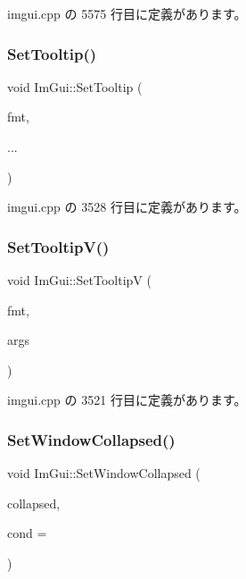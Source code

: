  imgui.\+cpp の 5575 行目に定義があります。

\mbox{\label{namespace_im_gui_a313073fa01b8a9791f241ef93091ce92}} 
\subsubsection{\texorpdfstring{Set\+Tooltip()}{SetTooltip()}}
{\footnotesize\ttfamily void Im\+Gui\+::\+Set\+Tooltip (\begin{DoxyParamCaption}\item[{const char $\ast$}]{fmt,  }\item[{}]{... }\end{DoxyParamCaption})}



 imgui.\+cpp の 3528 行目に定義があります。

\mbox{\label{namespace_im_gui_a3826acf68fc4a12bb66401575f51d6a2}} 
\subsubsection{\texorpdfstring{Set\+Tooltip\+V()}{SetTooltipV()}}
{\footnotesize\ttfamily void Im\+Gui\+::\+Set\+TooltipV (\begin{DoxyParamCaption}\item[{const char $\ast$}]{fmt,  }\item[{va\+\_\+list}]{args }\end{DoxyParamCaption})}



 imgui.\+cpp の 3521 行目に定義があります。

\mbox{\label{namespace_im_gui_ab5445711a74e0e1a58d1e464cdda252f}} 
\subsubsection{\texorpdfstring{Set\+Window\+Collapsed()}{SetWindowCollapsed()}\hspace{0.1cm}{\footnotesize\ttfamily [1/2]}}
{\footnotesize\ttfamily void Im\+Gui\+::\+Set\+Window\+Collapsed (\begin{DoxyParamCaption}\item[{bool}]{collapsed,  }\item[{\mbox{\hyperlink{imgui_8h_aef890d6ac872e12c5804d0b3e4f7f103}{Im\+Gui\+Cond}}}]{cond = {} }\end{DoxyParamCaption})}



